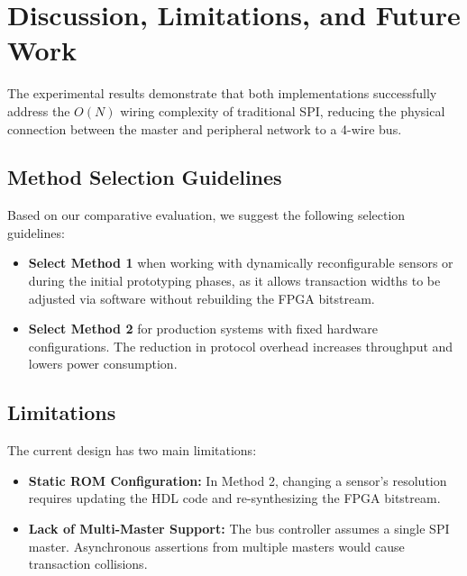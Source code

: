 \documentclass[conference]{IEEEtran}
\begin{document}
\section{Discussion, Limitations, and Future Work}
The experimental results demonstrate that both implementations successfully address the $O(N)$ wiring complexity of traditional SPI, reducing the physical connection between the master and peripheral network to a 4-wire bus. 

\subsection{Method Selection Guidelines}
Based on our comparative evaluation, we suggest the following selection guidelines:
\begin{itemize}
    \item \textbf{Select Method 1} when working with dynamically reconfigurable sensors or during the initial prototyping phases, as it allows transaction widths to be adjusted via software without rebuilding the FPGA bitstream.
    \item \textbf{Select Method 2} for production systems with fixed hardware configurations. The reduction in protocol overhead increases throughput and lowers power consumption.
\end{itemize}

\subsection{Limitations}
The current design has two main limitations:
\begin{itemize}
    \item \textbf{Static ROM Configuration:} In Method 2, changing a sensor's resolution requires updating the HDL code and re-synthesizing the FPGA bitstream.
    \item \textbf{Lack of Multi-Master Support:} The bus controller assumes a single SPI master. Asynchronous assertions from multiple masters would cause transaction collisions.
\end{itemize}
\end{document}
